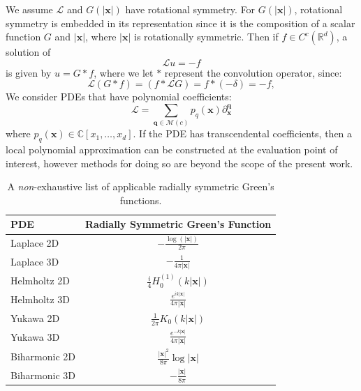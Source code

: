 \documentclass[12pt]{article}
\def\C{{\mathbb C}}
\def\R{{\mathbb R}}
\let\b=\boldsymbol
\theoremstyle{definition}
\theoremstyle{plain}
\theoremstyle{definition}
\begin{document}
We assume $\mathcal{L}$ and $G(|\b{x}|)$ have rotational symmetry. For $G(|\b{x}|)$, rotational symmetry is embedded in its representation since it is the composition of a scalar function $G$ and $|\b{x}|$, where $|\b{x}|$ is rotationally symmetric.
Then if $f \in C^c(\R^d)$, a solution of
\[
\mathcal{L} u  = -f
\]
is given by $u = G * f$, where we let $*$ represent the convolution operator, since:
\[
\mathcal{L} (G * f)= (f * \mathcal{L} G) = f * (-\delta) = -f,
\]
We consider PDEs that have polynomial coefficients:
\[
\mathcal{L}= \sum_{\b{q} \in \mathcal{M}(c)} p_q(\b{x})  \partial^{\b{q}}_{\b{x}}
\]
where $p_q(\b{x}) \in \C[x_1, \dots, x_d]$.
If the PDE has transcendental coefficients, then a local polynomial approximation can be constructed at the evaluation point of interest, however methods for doing so are beyond the scope of the present work.


\begin{table}[htbp]
   \centering
   \begin{tabular}{@{} lc @{}} %
      \toprule
      PDE    & Radially Symmetric Green's Function \\
      \midrule
      Laplace 2D      & $-\frac{\log(|{\b x}|)}{2\pi}$ \\
      Laplace 3D       & $-\frac{1}{4\pi|{\b x}|}$  \\
      Helmholtz 2D      &  $\frac{i}{4} H_0^{(1)}(k |{\b x}|)$     \\
      Helmholtz 3D       & $\frac{e^{i k |{\b x}|}}{4\pi |{\b x}|}$  \\
      Yukawa 2D       & $\frac{1}{2\pi} K_0(k|{\b x}|) $  \\
      Yukawa 3D       & $\frac{e^{-k|{\b x}|}}{4\pi |{\b x}|} $  \\
      Biharmonic 2D       & $\frac{|{\b x}|^2}{8\pi} \log| {\b x}|$  \\
      Biharmonic 3D       & $-\frac{|{\b x}|}{8 \pi} $  \\
      \bottomrule
   \end{tabular}
   \caption{A \textit{non}-exhaustive list of applicable radially symmetric Green's functions.}
   \label{tab:booktabs}
\end{table}
\end{document}
